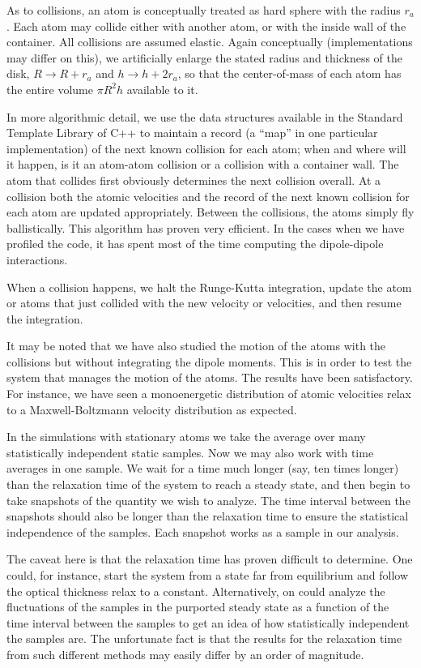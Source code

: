 As to collisions, an atom is conceptually treated as hard sphere with the radius $r_a$. Each atom may collide either with another atom, or with the inside wall of the container. All collisions are assumed elastic. Again conceptually (implementations may differ on this), we artificially enlarge the stated radius and thickness of the disk, 
$R\rightarrow R+r_a$ and $h\rightarrow h+2r_a$, so that the center-of-mass of each atom has the entire volume $\pi R^2h$ available to it.

In more algorithmic detail, we use the data structures available in the Standard Template Library of C++ to maintain a record (a ``map'' in one particular implementation) of the next known collision for each atom; when and where will it happen, is it an atom-atom collision or a collision with a container wall. The atom that collides first obviously determines the next collision overall. At a collision both the atomic velocities and the record of the next known collision for each atom are updated appropriately. Between the collisions, the atoms simply fly ballistically. This algorithm has proven very efficient. In the cases when we have profiled the code, it has spent most of the time computing the dipole-dipole interactions.

When a collision happens,  we halt the Runge-Kutta integration, update the atom or atoms that just collided with the new velocity or velocities, and then resume the integration.

It may be noted that we have also studied the motion of the atoms with the collisions but without integrating the dipole moments. This is in order to test the system that manages the motion of the atoms. The results have been satisfactory. For instance, we have seen a monoenergetic distribution of atomic velocities relax to a Maxwell-Boltzmann velocity distribution as expected.

In the simulations with stationary atoms we take the average over many statistically independent static samples. Now we may also work with time averages in one sample.  We wait for a time much longer (say, ten times longer) than the relaxation time of the system to reach a steady state, and then begin to take snapshots of the quantity we wish to analyze. The time interval between the snapshots should also be longer than the relaxation time to ensure the statistical independence of the samples. Each snapshot works as a sample in our analysis. 

The caveat here is that the relaxation time has proven difficult to determine. One could, for instance, start the system from a state far from equilibrium and follow the optical thickness relax to a constant. Alternatively, on could analyze the fluctuations of the samples in the purported steady state as a function of the time interval between the samples to get an idea of how statistically independent the samples are. The unfortunate fact is that the results for the relaxation time from such different methods may easily differ by an order of magnitude.

